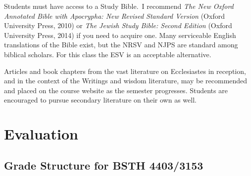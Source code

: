 \documentclass[titlepage]{article}
\begin{document}
Students must have access to a Study Bible. I recommend \emph{The New
Oxford Annotated Bible with Apocrypha: New Revised Standard Version}
(Oxford University Press, 2010) or \emph{The Jewish Study Bible: Second
Edition} (Oxford University Press, 2014) if you need to acquire one.
Many serviceable English translations of the Bible exist, but the NRSV
and NJPS are standard among biblical scholars. For this class the ESV is
an acceptable alternative.

Articles and book chapters from the vast literature on Ecclesiastes in
reception, and in the context of the Writings and wisdom literature, may
be recommended and placed on the course website as the semester
progresses. Students are encouraged to pursue secondary literature on
their own as well.

\section{Evaluation}
\label{evaluation}

\subsection{Grade Structure for BSTH 4403/3153}%
\label{structure}
\end{document}
